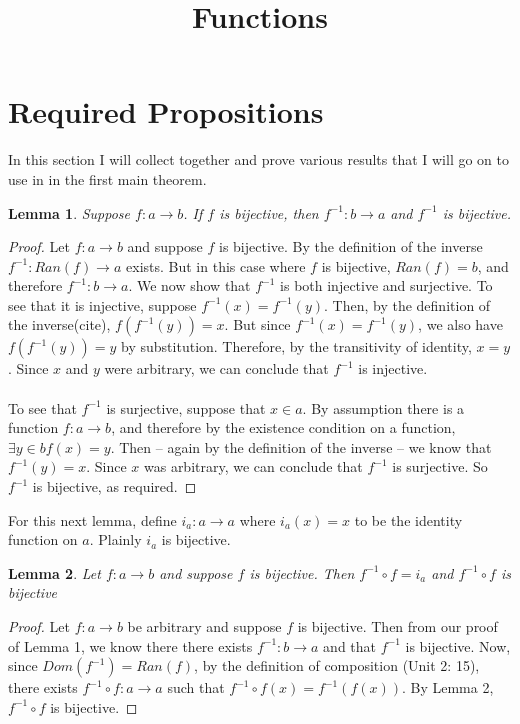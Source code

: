 \documentclass{article}
\title{Functions}
\begin{document}
\maketitle
\newtheorem{theorem}{Theorem}
\newtheorem{proposition}{Proposition}
\newtheorem{lemma}[theorem]{Lemma}
\section{Required Propositions}

In this section I will collect together and prove various results that I will go on to use in in the first main theorem.

\begin{lemma}
Suppose $ f : a \rightarrow b$. If $f$ is bijective, then $f^{-1}: b \rightarrow a$ and $f^{-1}$ is bijective. \end{lemma}
\begin{proof}
Let $ f : a \rightarrow b$ and suppose $f$ is bijective. By the definition of the inverse $f^{-1}: Ran(f) \rightarrow a$ exists. But in this case where $f$ is bijective, $Ran(f) = b$, and therefore
$f^{-1}: b \rightarrow a$. We now show that $f^{-1}$ is both injective and surjective. To see that it is injective, suppose $f^{-1}(x) = f^{-1}(y)$. Then, by the definition of the inverse(cite), $f(f^{-1}(y)) = x$. But since $f^{-1}(x) = f^{-1}(y)$, we also have $f(f^{-1}(y)) = y$ by substitution. Therefore, by the transitivity of identity, $x = y$. Since $x$ and $y$ were arbitrary, we can conclude that $f^{-1}$ is injective. \\ \\To see that $f^{-1}$ is surjective, suppose that $x \in a$. By assumption there is a function $ f : a \rightarrow b$, and therefore by the existence condition on a function, $\exists y \in b f(x) = y$. Then – again by the definition of the inverse – we know that $f^{-1}(y) = x$. Since $x$ was arbitrary, we can conclude that $f^{-1}$ is surjective. So $f^{-1}$ is bijective, as required. 
\end{proof}For this next lemma, define $i_a: a \rightarrow a$ where $i_a(x) = x$ to be the identity function on $a$. Plainly $i_a$ is bijective.
\begin{lemma}
Let $f : a \rightarrow b$ and suppose $f$ is bijective. Then $f^{-1} \circ f = i_a$ and $f^{-1} \circ f$  is bijective \end{lemma}
\begin{proof}
Let $f : a \rightarrow b$ be arbitrary and suppose $f$ is bijective. Then from our proof of Lemma 1, we know there there exists $f^{-1}: b \rightarrow a$ and that $f^{-1}$ is bijective. Now, since $Dom(f^{-1}) = Ran(f)$, by the definition of composition (Unit 2: 15), there exists $f^{-1} \circ f : a \rightarrow a$ such that $f^{-1} \circ f(x) = f^{-1}(f(x))$. By Lemma 2, $f^{-1} \circ f$ is bijective.
\end{proof}
\end{document}
